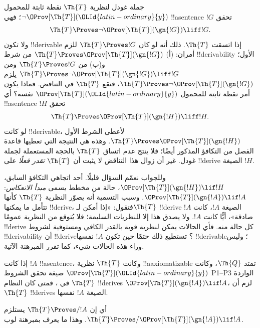 \documentclass[../../../include/open-logic-section]{subfiles}
\begin{document}


جملة غودل لنظرية $\Th{T}$ نقطة ثابتة للمحمول $\lnot
\OProv[\Th{T}]({\OLId{latin-ordinary}{y}})$؛ فهي !!a{sentence} $!G$ تحقق
\[
\Th{T} \Proves \lnot \OProv[\Th{T}](\gn{!G}) \liff !G.
\]
ولا تكون !!{derivable} إذا اتسقت $\Th{T}$.
ذلك أنه لو كان $\Th{T} \Proves !G$ للزم أمران:
(أ) $\Th{T} \Proves \OProv[\Th{T}](\gn{!G})$ من شرط
!!{derivability} الأول؛ و(ب) من $\Th{T} \Proves !G$
ومن $\Th{T} \Proves \lnot \OProv[\Th{T}](\gn{!G})
\liff !G$ يلزم $\Th{T} \Proves \lnot \OProv[\Th{T}](\gn{!G})$،
فتقع $\Th{T}$ في التناقض. فماذا يكون أمر نقطة ثابتة للمحمول
$\OProv[\Th{T}]({\OLId{latin-ordinary}{y}})$ نفسه؟ أي !!a{sentence} $!H$ تحقق
\[
\Th{T} \Proves \OProv[\Th{T}](\gn{!H}) \liff !H.
\]
لو كانت !!{derivable}، لأعطى الشرط الأول
$\Th{T} \Proves \OProv[\Th{T}](\gn{!H})$.
وهذه هي النتيجة التي تعطيها قاعدة الفصل من التكافؤ المذكور أيضًا؛
فلا ينتج عدم اتساق $\Th{T}$ بالحجة المستعملة لجملة غودل.
غير أن زوال هذا التناقض لا يثبت أن $\Th{T}$
\emph{تقدر فعلًا} على !!{derive} الصيغة $!H$.

وللجواب نعمّم السؤال قليلًا. أحد اتجاهي التكافؤ السابق،
$\OProv[\Th{T}](\gn{!H}) \lif !H$، حالة من مخطط يسمى
\emph{مبدأ الانعكاس}: $\OProv[\Th{T}](\gn{!A}) \lif !A$.
وسبب التسمية أنه يصوّر النظرية $\Th{T}$ كأنها تتأمل ما يمكنها
!!{derive}، فتقول: «إذا أمكن لـ$\Th{T}$ !!{derive}
الصيغة $!A$، كانت $!A$ صادقة»، أيًّا كانت $!A$.
ولا يصدق هذا إلا للنظريات السليمة؛ فلا يُتوقع من النظرية عمومًا
!!{derive} كل حالة منه. فأي الحالات يمكن لنظرية قوية بالقدر
الكافي ومستوفية لشروط !!{derivability} أن !!{derive}؟
تستطيع ذلك حتمًا حين تكون $!A$ نفسها !!{derivable}؛ وليس وراء
هذه الحالات شيء، كما تقرر المبرهنة الآتية.

\begin{thm}
إذا كانت $!A$ !!a{sentence}، وكانت $\Th{T}$ نظرية
!!a{axiomatizable} تمتد $\Th{Q}$، وكانت
$\OProv[\Th{T}]({\OLId{latin-ordinary}{y}})$ صيغة تحقق الشروط P1--P3 الواردة في
، فمتى كان النظام $\Th{T}$ !!{derive}s
$\OProv[\Th{T}](\gn{!A}) \lif !A$، لزم أن $\Th{T}$
!!{derive}s الصيغة $!A$ نفسها.
\end{thm}

أي إن $\Th{T} \Proves/ !A$ يستلزم
$\Th{T} \Proves/ \OProv[\Th{T}](\gn{!A}) \lif !A$.
وهذا ما يعرف بمبرهنة لوب.
\end{document}
